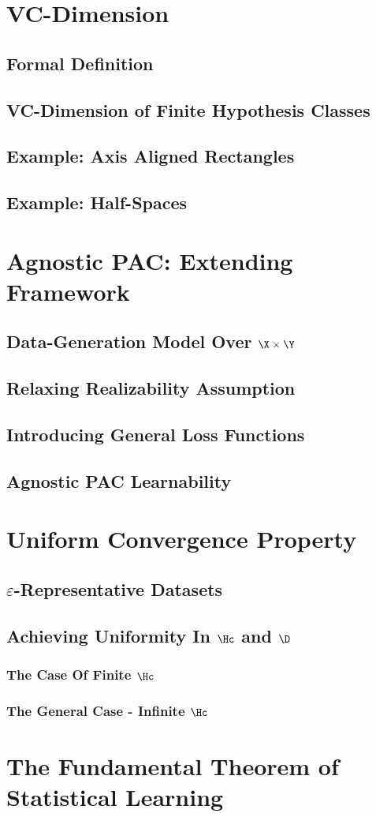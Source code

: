     \section{VC-Dimension}
        \subsection{Formal Definition}
        \subsection{VC-Dimension of Finite Hypothesis Classes}
        \subsection{Example: Axis Aligned Rectangles}
        \subsection{Example: Half-Spaces}
        
    \section{Agnostic PAC: Extending Framework}
        \subsection{Data-Generation Model Over $\X\times\Y$}
        \subsection{Relaxing Realizability Assumption}
        \subsection{Introducing General Loss Functions}
        \subsection{Agnostic PAC Learnability}
    
    \section{Uniform Convergence Property}
        \subsection{$\varepsilon$-Representative Datasets}
        \subsection{Achieving Uniformity In $\Hc$ and $\D$}
            \subsubsection{The Case Of Finite $\Hc$}
            \subsubsection{The General Case - Infinite $\Hc$}
    
    \section{The Fundamental Theorem of Statistical Learning}
